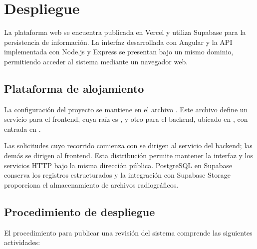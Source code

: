 \section{Despliegue}

La plataforma web se encuentra publicada en Vercel y utiliza Supabase
para la persistencia de información. La interfaz desarrollada con Angular
y la API implementada con Node.js y Express se presentan bajo un mismo
dominio, permitiendo acceder al sistema mediante un navegador web.

\subsection{Plataforma de alojamiento}

La configuración del proyecto se mantiene en el archivo
. Este archivo define un servicio para el frontend,
cuya raíz es , y otro para el backend, ubicado en
, con entrada en .

Las solicitudes cuyo recorrido comienza con  se dirigen
al servicio del backend; las demás se dirigen al frontend. Esta
distribución permite mantener la interfaz y los servicios HTTP bajo
la misma dirección pública. PostgreSQL en Supabase conserva los registros
estructurados y la integración con Supabase Storage proporciona el
almacenamiento de archivos radiográficos.

\subsection{Procedimiento de despliegue}

El procedimiento para publicar una revisión del sistema comprende
las siguientes actividades:

